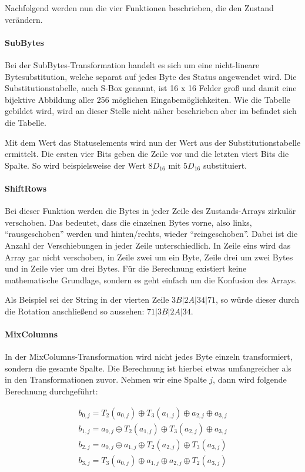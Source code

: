   Nachfolgend werden nun die vier Funktionen beschrieben, die den Zustand verändern.
  
  \paragraph{SubBytes}
   Bei der SubBytes-Transformation handelt es sich um eine nicht-lineare Bytesubstitution, welche
   separat auf jedes Byte des Status angewendet wird. Die Substitutionstabelle, auch S-Box genannt,
   ist 16 x 16 Felder groß und damit eine bijektive Abbildung aller 256 möglichen Eingabemöglichkeiten.
   Wie die Tabelle gebildet wird, wird an dieser Stelle nicht näher beschrieben aber im 
   befindet sich die Tabelle.
   
   Mit dem Wert das Statuselements wird nun der Wert aus der Substitutionstabelle ermittelt. Die ersten vier
   Bits geben die Zeile vor und die letzten viert Bits die Spalte. So wird beispielsweise der Wert $8D_{16}$ mit
   $5D_{16}$ substituiert.
   
  \paragraph{ShiftRows}
   Bei dieser Funktion werden die Bytes in jeder Zeile des Zustands-Arrays zirkulär verschoben. Das bedeutet,
   dass die einzelnen Bytes vorne, also links, ``rausgeschoben'' werden und hinten/rechts, wieder
   ``reingeschoben''. Dabei ist  die Anzahl der Verschiebungen in jeder Zeile unterschiedlich. In Zeile eins wird
   das Array gar nicht verschoben, in Zeile zwei um ein Byte, Zeile drei um zwei Bytes und in Zeile vier um drei
   Bytes. Für die Berechnung existiert keine mathematische Grundlage, sondern es geht einfach
   um die Konfusion des Arrays.
   
   Als Beispiel sei der String in der vierten Zeile $3B | 2A | 34 | 71$, so würde dieser durch die Rotation anschließend
   so aussehen: $71 | 3B | 2A | 34$.
   
  \paragraph{MixColumns}
   In der MixColumns-Transformation wird nicht jedes Byte einzeln transformiert, sondern die gesamte Spalte.
   Die Berechnung ist hierbei etwas umfangreicher als in den Transformationen zuvor. Nehmen wir eine Spalte
   $j$, dann wird folgende Berechnung durchgeführt:
   
    \begin{equation*}
     \begin{split}
     b_{0,j} = T_2(a_{0,j}) \oplus T_3(a_{1,j}) \oplus a_{2,j} \oplus a_{3,j} \\
     b_{1,j} = a_{0,j} \oplus T_2(a_{1,j}) \oplus T_3(a_{2,j}) \oplus a_{3,j} \\
     b_{2,j} = a_{0,j} \oplus a_{1,j} \oplus T_2(a_{2,j}) \oplus T_3(a_{3,j}) \\
     b_{3,j} = T_3(a_{0,j}) \oplus a_{1,j} \oplus a_{2,j} \oplus T_2(a_{3,j})
     \end{split}
    \end{equation*}
    
